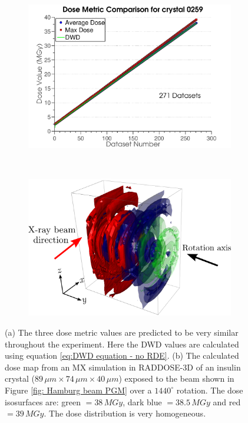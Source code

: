 \begin{figure}
        \centering
        \begin{subfigure}[b]{1\textwidth}
                \centering
                \includegraphics[width=\textwidth]{figures/dwd/metrics.pdf}
                \caption{}
                \label{fig:Metrics}
        \end{subfigure}
				\\
        \begin{subfigure}[b]{1\textwidth}
                \centering
                \includegraphics[width=\textwidth]{figures/dwd/raddose3d.png}
                \caption{}
                \label{fig:RADDOSE-3D dose contours uniform irradiation}
        \end{subfigure}
        \caption[Dose metrics and dose state of crystal showing uniform irradiation.]{(a) The three dose metric values are predicted to be very similar throughout the experiment.
        Here the DWD values are calculated using equation \ref{eq:DWD equation - no RDE}.
        (b) The calculated dose map from an MX simulation in RADDOSE-3D of an insulin crystal ($89\,\mu m \times 74\,\mu m \times 40\,\mu m$) exposed to the beam shown in Figure \ref{fig: Hamburg beam PGM} over a $1440^{\circ}$ rotation. The dose isosurfaces are: green $= 38\, MGy$, dark blue $= 38.5\, MGy$ and red $= 39\, MGy$. The dose distribution is very homogeneous.}
        \label{fig:Uniform}
\end{figure}

